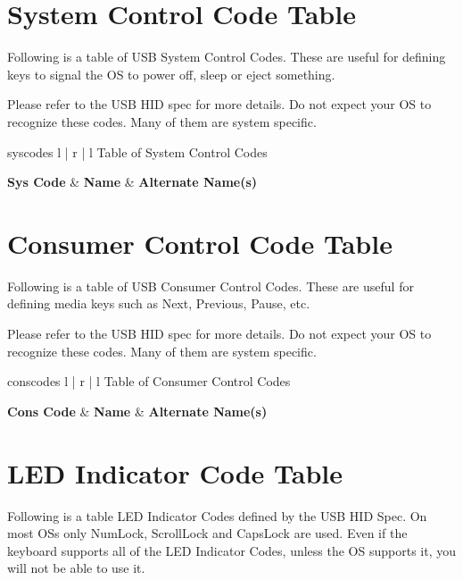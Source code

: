 \documentclass{kiibohd-template}
\begin{document}
\chapter{System Control Code Table}
\label{chpt:SysCodeTable}

Following is a table of USB System Control Codes.
These are useful for defining keys to signal the OS to power off, sleep or eject something.

Please refer to the USB HID spec for more details.
Do not expect your OS to recognize these codes.
Many of them are system specific.

\begin{ltable}{syscodes}{ l | r | l }{Table of System Control Codes}

\textbf{Sys Code} & \textbf{Name} & \textbf{Alternate Name(s)} \\
\hline
\hline


\end{ltable}


\newpage
\chapter{Consumer Control Code Table}
\label{chpt:ConsCodeTable}

Following is a table of USB Consumer Control Codes.
These are useful for defining media keys such as Next, Previous, Pause, etc.

Please refer to the USB HID spec for more details.
Do not expect your OS to recognize these codes.
Many of them are system specific.

\begin{ltable}{conscodes}{ l | r | l }{Table of Consumer Control Codes}

\textbf{Cons Code} & \textbf{Name} & \textbf{Alternate Name(s)} \\
\hline
\hline


\end{ltable}


\newpage
\chapter{LED Indicator Code Table}
\label{chpt:LEDIndicatorCodeTable}
Following is a table LED Indicator Codes defined by the USB HID Spec.
On most OSs only NumLock, ScrollLock and CapsLock are used.
Even if the keyboard supports all of the LED Indicator Codes, unless the OS supports it, you will not be able to use it.
\end{document}
